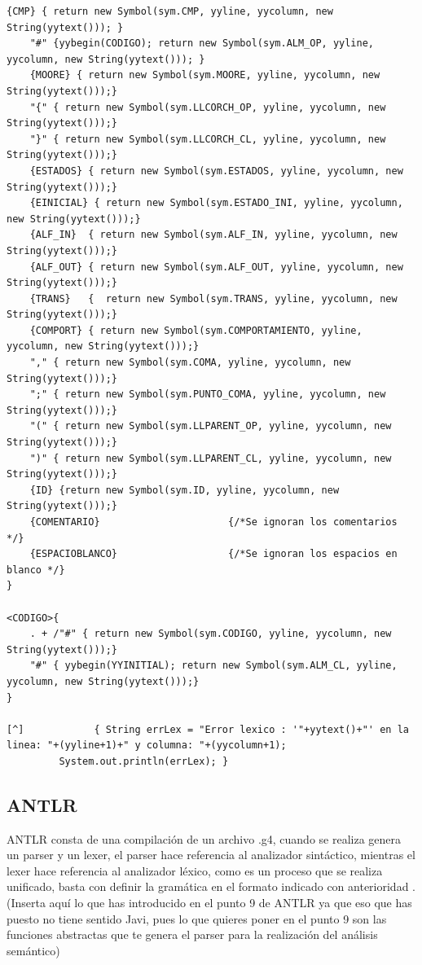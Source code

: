 \documentclass[12pt,a4paper]{article}
\begin{document}
\begin{lstlisting}[caption=Analizador Léxico en JFlex]
	{CMP} { return new Symbol(sym.CMP, yyline, yycolumn, new String(yytext())); }
	"#" {yybegin(CODIGO); return new Symbol(sym.ALM_OP, yyline, yycolumn, new String(yytext())); }
	{MOORE} { return new Symbol(sym.MOORE, yyline, yycolumn, new String(yytext()));}
	"{" { return new Symbol(sym.LLCORCH_OP, yyline, yycolumn, new String(yytext()));}
	"}" { return new Symbol(sym.LLCORCH_CL, yyline, yycolumn, new String(yytext()));}
	{ESTADOS} { return new Symbol(sym.ESTADOS, yyline, yycolumn, new String(yytext()));}
	{EINICIAL} { return new Symbol(sym.ESTADO_INI, yyline, yycolumn, new String(yytext()));}
	{ALF_IN}  { return new Symbol(sym.ALF_IN, yyline, yycolumn, new String(yytext()));}
	{ALF_OUT} { return new Symbol(sym.ALF_OUT, yyline, yycolumn, new String(yytext()));}
	{TRANS}   {  return new Symbol(sym.TRANS, yyline, yycolumn, new String(yytext()));}
	{COMPORT} { return new Symbol(sym.COMPORTAMIENTO, yyline, yycolumn, new String(yytext()));}
	"," { return new Symbol(sym.COMA, yyline, yycolumn, new String(yytext()));}
	";" { return new Symbol(sym.PUNTO_COMA, yyline, yycolumn, new String(yytext()));}
	"(" { return new Symbol(sym.LLPARENT_OP, yyline, yycolumn, new String(yytext()));}
	")" { return new Symbol(sym.LLPARENT_CL, yyline, yycolumn, new String(yytext()));}
	{ID} {return new Symbol(sym.ID, yyline, yycolumn, new String(yytext()));}
	{COMENTARIO}                      {/*Se ignoran los comentarios */}
	{ESPACIOBLANCO}                   {/*Se ignoran los espacios en blanco */}	
}

<CODIGO>{
	. + /"#" { return new Symbol(sym.CODIGO, yyline, yycolumn, new String(yytext()));}
	"#" { yybegin(YYINITIAL); return new Symbol(sym.ALM_CL, yyline, yycolumn, new String(yytext()));}
}

[^]            { String errLex = "Error lexico : '"+yytext()+"' en la linea: "+(yyline+1)+" y columna: "+(yycolumn+1);
		 System.out.println(errLex); }

\end{lstlisting}

\subsection{ANTLR}
ANTLR consta de una compilación de un archivo .g4, cuando se realiza genera un parser y un
lexer, el parser hace referencia al analizador sintáctico, mientras el lexer hace referencia al
analizador léxico, como es un proceso que se realiza unificado, basta con definir la gramática
en el formato indicado con anterioridad . (Inserta aquí lo que has introducido en el punto 9 de
ANTLR ya que eso que has puesto no tiene sentido Javi, pues lo que quieres poner en el punto
9 son las funciones abstractas que te genera el parser para la realización del análisis
semántico)
\end{document}
